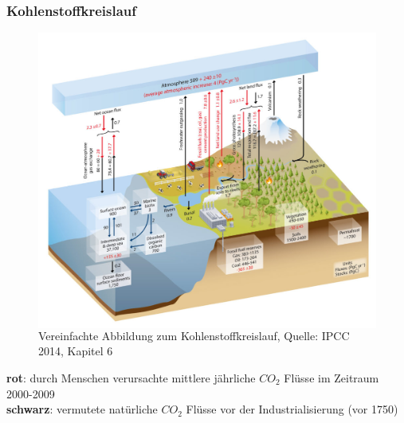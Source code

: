 \begin{frame}
	\frametitle{Kohlenstoffkreislauf}
	
	
	\begin{figure}
		\begin{columns}
		\centering
		\includegraphics[width=0.9\linewidth]{bilder/IPCC_Cycles_carbon.jpg}
		\caption{Vereinfachte Abbildung zum Kohlenstoffkreislauf, Quelle: IPCC 2014, Kapitel 6}
		\end{columns}
	\end{figure}
	
	\color{red}\textbf{rot}\color{black}: durch Menschen verursachte mittlere jährliche $CO_2$ Flüsse im Zeitraum 2000-2009 \\%
	\textbf{schwarz}: vermutete natürliche $CO_2$ Flüsse vor der Industrialisierung (vor 1750)
\end{frame}


